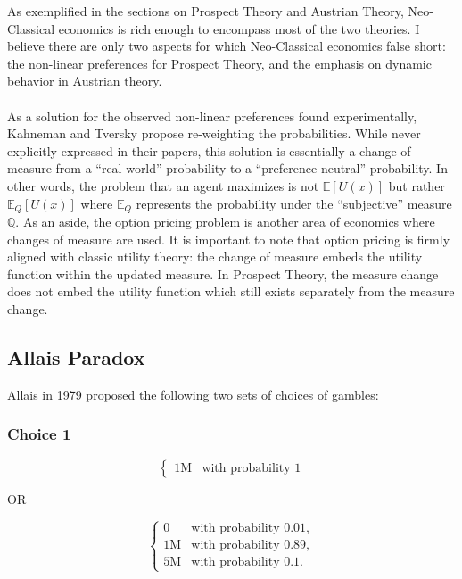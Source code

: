 \documentclass{article}
\begin{document}
As exemplified in the sections on Prospect Theory and Austrian Theory, Neo-Classical economics is rich enough to encompass most of the two theories.  I believe there are only two aspects for which Neo-Classical economics false short: the non-linear preferences for Prospect Theory, and the emphasis on dynamic behavior in Austrian theory.  
\\
\\
As a solution for the observed non-linear preferences found experimentally, Kahneman and Tversky propose re-weighting the probabilities.  While never explicitly expressed in their papers, this solution is essentially a change of measure from a ``real-world'' probability to a ``preference-neutral'' probability.  In other words, the problem that an agent maximizes is not \(\mathbb{E}\left[U(x)\right]\) but rather \(\mathbb{E}_Q\left[U(x)\right]\) where \(\mathbb{E}_Q\) represents the probability under the ``subjective'' measure \(\mathbb{Q}\).  As an aside, the option pricing problem is another area of economics where changes of measure are used.  It is important to note that option pricing is firmly aligned with classic utility theory: the change of measure embeds the utility function within the updated measure.  In Prospect Theory, the measure change does not embed the utility function which still exists separately from the measure change.  

\subsection{Allais Paradox}

Allais in 1979 proposed the following two sets of choices of gambles:

\subsubsection{Choice 1}

\begin{equation*}
\left\{
\begin{array}{rl}
1\text{M} & \text{with probability } 1
\end{array} \right.
\end{equation*}

OR

\begin{equation*}
\left\{
\begin{array}{rl}
0 & \text{with probability } 0.01,
\\1\text{M} & \text{with probability } 0.89,
\\5\text{M} & \text{with probability } 0.1.
\end{array} \right.
\end{equation*}
\end{document}
